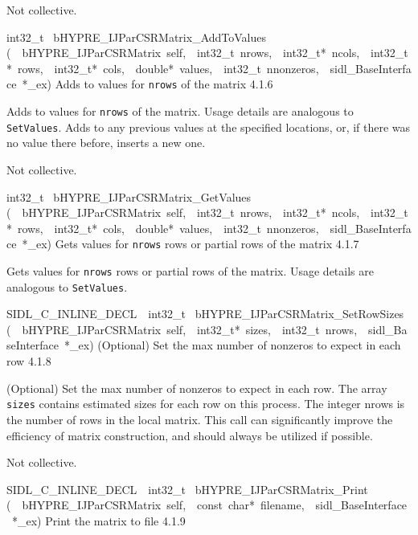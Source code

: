 \documentclass{article}
\begin{document}
\begin{cxxentry}
\begin{cxxentry}
\begin{cxxfunction}
\begin{cxxdoc}
Not collective.
\end{cxxdoc}
\end{cxxfunction}
\begin{cxxfunction}
{int32\_t\ }
        {bHYPRE\_IJParCSRMatrix\_AddToValues}
        {(\ \ bHYPRE\_IJParCSRMatrix\ self,\ \ int32\_t\ nrows,\ \ int32\_t*\ ncols,\ \ int32\_t*\ rows,\ \ int32\_t*\ cols,\ \ double*\ values,\ \ int32\_t\ nnonzeros,\ \ sidl\_BaseInterface\ *\_ex)}
        {
Adds to values for {\tt nrows} of the matrix}
        {4.1.6}
\begin{cxxdoc}

Adds to values for {\tt nrows} of the matrix.  Usage details
are analogous to {\tt SetValues}.  Adds to any previous
values at the specified locations, or, if there was no value
there before, inserts a new one.

Not collective.
\end{cxxdoc}
\end{cxxfunction}
\begin{cxxfunction}
{int32\_t\ }
        {bHYPRE\_IJParCSRMatrix\_GetValues}
        {(\ \ bHYPRE\_IJParCSRMatrix\ self,\ \ int32\_t\ nrows,\ \ int32\_t*\ ncols,\ \ int32\_t*\ rows,\ \ int32\_t*\ cols,\ \ double*\ values,\ \ int32\_t\ nnonzeros,\ \ sidl\_BaseInterface\ *\_ex)}
        {
Gets values for {\tt nrows} rows or partial rows of the
matrix}
        {4.1.7}
\begin{cxxdoc}

Gets values for {\tt nrows} rows or partial rows of the
matrix.  Usage details are analogous to {\tt SetValues}.
\end{cxxdoc}
\end{cxxfunction}
\begin{cxxfunction}
{SIDL\_C\_INLINE\_DECL\ \ int32\_t\ }
        {bHYPRE\_IJParCSRMatrix\_SetRowSizes}
        {(\ \ bHYPRE\_IJParCSRMatrix\ self,\ \ int32\_t*\ sizes,\ \ int32\_t\ nrows,\ \ sidl\_BaseInterface\ *\_ex)}
        {
(Optional) Set the max number of nonzeros to expect in each
row}
        {4.1.8}
\begin{cxxdoc}

(Optional) Set the max number of nonzeros to expect in each
row.  The array {\tt sizes} contains estimated sizes for each
row on this process.  The integer nrows is the number of rows in
the local matrix.  This call can significantly improve the
efficiency of matrix construction, and should always be
utilized if possible.

Not collective.
\end{cxxdoc}
\end{cxxfunction}
\begin{cxxfunction}
{SIDL\_C\_INLINE\_DECL\ \ int32\_t\ }
        {bHYPRE\_IJParCSRMatrix\_Print}
        {(\ \ bHYPRE\_IJParCSRMatrix\ self,\ \ const\ char*\ filename,\ \ sidl\_BaseInterface\ *\_ex)}
        {
Print the matrix to file}
        {4.1.9}
\begin{cxxdoc}


\end{cxxdoc}
\end{cxxfunction}
\end{cxxentry}
\end{cxxentry}
\end{document}
